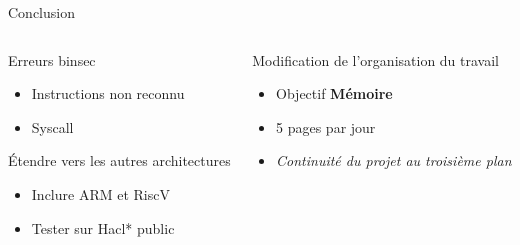 \documentclass[A4,svgnames,9pt,aspectratio=169]{beamer}
\begin{document}
\begin{frame}{Conclusion}

  \begin{columns}
    \begin{column}{0.5\textwidth}
      \begin{block}{Erreurs binsec}
        \begin{itemize}
          \item Instructions non reconnu
          \item Syscall
        \end{itemize}
      \end{block}
    
      \begin{block}{Étendre vers les autres architectures}
        \begin{itemize}
          \item Inclure ARM et RiscV
          \item Tester sur Hacl* public
        \end{itemize}
      \end{block}
      
    \end{column}
    \pause
    \begin{column}{0.5\textwidth}
      \begin{block}{Modification de l'organisation du travail}
        \begin{itemize}
          \item Objectif \textbf{Mémoire}
          \item 5 pages par jour
          \item \textit{Continuité du projet au troisième plan}
        \end{itemize}
      \end{block}
    \end{column}
  \end{columns}
\end{frame}


\frame{\merci}
\end{document}
